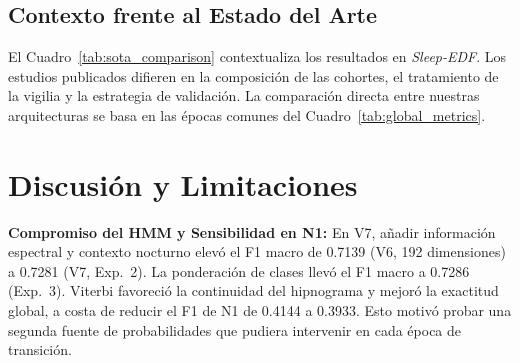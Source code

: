 \documentclass[conference]{IEEEtran}
\begin{document}
\subsection{Contexto frente al Estado del Arte}
El Cuadro~\ref{tab:sota_comparison} contextualiza los resultados en \textit{Sleep-EDF}. Los estudios publicados difieren en la composición de las cohortes, el tratamiento de la vigilia y la estrategia de validación. La comparación directa entre nuestras arquitecturas se basa en las épocas comunes del Cuadro~\ref{tab:global_metrics}.

\begin{table}[htbp]
\centering
\caption{Referencia Contextual frente al Estado del Arte en \textit{Sleep-EDF} (Protocolos No Equivalentes)}
\label{tab:sota_comparison}
\end{table}

\section{Discusión y Limitaciones}
\textbf{Compromiso del HMM y Sensibilidad en N1:}
En V7, añadir información espectral y contexto nocturno elevó el F1 macro de 0.7139 (V6, 192 dimensiones) a 0.7281 (V7, Exp.~2). La ponderación de clases llevó el F1 macro a 0.7286 (Exp.~3). Viterbi favoreció la continuidad del hipnograma y mejoró la exactitud global, a costa de reducir el F1 de N1 de 0.4144 a 0.3933. Esto motivó probar una segunda fuente de probabilidades que pudiera intervenir en cada época de transición.
\end{document}
